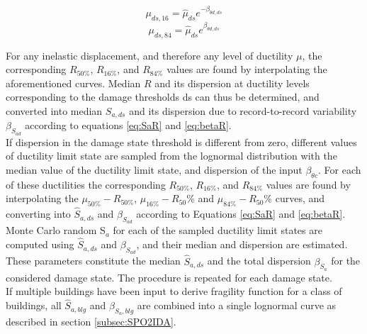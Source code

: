 \begin{equation}
\mu_{ds,16} = \hat{\mu}_{ds} e^{-\beta_{\theta d,ds}}
\label{eq:mu16-beta}
\end{equation}
\begin{equation}
\mu_{ds,84} = \hat{\mu}_{ds} e^{\beta_{\theta d,ds}}
\label{eq:mu84-beta}
\end{equation}

For any inelastic displacement, and therefore any level of ductility $\mu$, the corresponding $R_{50\%}$, $R_{16\%}$, and $R_{84\%}$ values are found by interpolating the aforementioned curves. Median $R$ and its dispersion at ductility levels corresponding to the damage thresholds ds can thus be determined, and converted into median $S_{a, ds}$ and its dispersion due to record-to-record variability $\beta_{S_{a d}}$ according to equations \ref{eq:SaR} and \ref{eq:betaR}. \\

If dispersion in the damage state threshold is different from zero, different values of ductility limit state are sampled from the lognormal distribution with the median value of the ductility limit state, and dispersion of the input $\beta_{\theta c}$. For each of these ductilities the corresponding $R_{50\%}$, $R_{16\%}$, and $R_{84\%}$ values are found by interpolating the $\mu_{50\%}-R_{50\%}$, $\mu_{16\%}-R_50\%$ and $\mu_{84\%}-R_50\%$ curves, and converting into $\hat{S}_{a,ds}$ and $\beta_{S_{a d}}$ according to Equations \ref{eq:SaR} and \ref{eq:betaR}. Monte Carlo random S$_a$ for each of the sampled ductility limit states are computed using $\hat{S}_{a,ds}$ and $\beta_{S_{a d}}$, and their median and dispersion are estimated. These parameters constitute the median $\hat{S}_{a,ds}$ and the total dispersion $\beta_{S_a}$ for the considered damage state. The procedure is repeated for each damage state.\\

If multiple buildings have been input to derive fragility function for a class of buildings, all $\hat{S}_{a, blg}$ and $\beta_{S_a, blg}$ are combined into a single lognormal curve as described in section \ref{subsec:SPO2IDA}. \\


